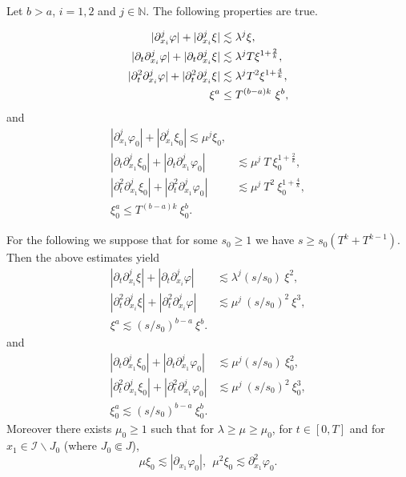 \documentclass[a4paper, 12pt]{article}
\theoremstyle{plain}
\theoremstyle{definition}
\numberwithin{theorem}{section}
\numberwithin{equation}{section}
\begin{document}
{Let $b>a$, $i=1,2$ and $j\in \mathbb{N}$. The following properties are true.


\begin{align}\label{prop-phi}
|\partial_{x_i}^j\varphi|+|\partial_{x_i}^j\xi|&\lesssim \lambda^j\xi,\\\notag
|\partial_t\partial_{x_i}^j\varphi|+|\partial_t\partial_{x_i}^j\xi|&\lesssim \lambda^j T\xi^{1+\frac{2}{k}},\\ \notag
|\partial^2_t\partial_{x_i}^j \varphi|+|\partial^2_t\partial_{x_i}^j \xi|&\lesssim \lambda^j T^2\xi^{1+\frac4k},\\ \notag
\xi^a&\leq T^{(b-a)k}~\xi^b,
\end{align}
and
\begin{align}
|\partial^j_{x_1}\varphi_0|+|\partial^j_{x_1}\xi_0|\lesssim \mu^j\xi_0,\label{poutre1} 
\\
\label{n2}
|\partial_t\partial^j_{x_1}\xi_0|+|\partial_t\partial^j_{x_1}\varphi_0|&\lesssim\mu^j~T~\xi_0^{1+\frac{2}{k}},\\ \label{n3}
|\partial^2_t\partial^j_{x_1}\xi_0|+|\partial^2_t\partial^j_{x_1}\varphi_0|&\lesssim\mu^j~T^2~\xi_0^{1+\frac{4}{k}},\\
\xi_0^a \leq T^{(b-a)k}~\xi^b_0.
\end{align}

For the following we suppose that for some $s_0\geq 1$ we have $s\geq s_0 (T^k+T^{k-1})$. Then the above estimates yield
\begin{align}
\label{n2-1}
|\partial_t\partial^j_{x_i}\xi|+|\partial_t\partial^j_{x_i}\varphi|&\lesssim\lambda^j\left(s/s_0\right)~\xi^2,\\ \label{n3-1}
|\partial^2_t\partial^j_{x_i}\xi|+|\partial^2_t\partial^j_{x_i}\varphi|&\lesssim\mu^j~\left(s/s_0\right)^2~\xi^3,\\
\xi^a \lesssim \left(s/s_0\right)^{b-a}~\xi^b.\label{n1-1}
\end{align}
and
\begin{align}
\label{n2-2}
|\partial_t\partial^j_{x_1}\xi_0|+|\partial_t\partial^j_{x_1}\varphi_0|&\lesssim\mu^j\left(s/s_0\right)~\xi_0^2,\\ \label{n3-2}
|\partial^2_t\partial^j_{x_1}\xi_0|+|\partial^2_t\partial^j_{x_1}\varphi_0|&\lesssim\mu^j~\left(s/s_0\right)^2~\xi_0^3,\\
\xi_0^a\lesssim \left(s/s_0\right)^{b-a}~\xi^b_0.\label{n1-2}
\end{align}
Moreover there exists $\mu_0\geq 1$ such that for $\lambda\geq\mu\geq\mu_0$, for $t\in [0,T]$ and for $x_1\in\mathcal{I}\smallsetminus J_0$ (where $J_0\Subset J$),
\begin{equation}\label{poutre2-0}
\mu\xi_0\lesssim |\partial_{x_1}\varphi_0|,~~ \mu^2\xi_0\lesssim \partial^2_{x_1}\varphi_0.
\end{equation}


}
\end{document}

